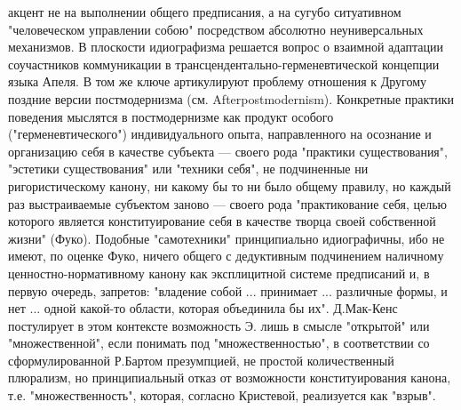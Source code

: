 \documentclass[12pt]{article}
\begin{document}
акцент не на выполнении общего предписания, а на сугубо ситуативном "человеческом управлении собою"
посредством абсолютно неуниверсальных механизмов. В плоскости идиографизма решается вопрос о взаимной
адаптации соучастников коммуникации в трансцендентально-герменевтической концепции языка Апеля. В том
же  ключе  артикулируют  проблему  отношения  к  Другому  поздние  версии  постмодернизма  (см.  Afterpostmodernism).  Конкретные  практики  поведения  мыслятся  в  постмодернизме  как  продукт  особого
("герменевтического") индивидуального опыта, направленного на осознание и организацию себя в качестве
субъекта  —  своего  рода  "практики  существования",  "эстетики  существования"  или  "техники  себя",  не
подчиненные  ни  ригористическому  канону,  ни  какому  бы  то  ни  было  общему  правилу,  но  каждый  раз
выстраиваемые  субъектом  заново  —  своего  рода  "практикование  себя,  целью  которого  является
конституирование  себя  в  качестве  творца  своей  собственной  жизни"  (Фуко).  Подобные  "самотехники"
принципиально идиографичны, ибо не имеют, по оценке Фуко, ничего общего с дедуктивным подчинением
наличному  ценностно-нормативному  канону  как  эксплицитной  системе  предписаний  и,  в  первую  очередь,
запретов:  "владение  собой  ...  принимает  ...  различные  формы,  и  нет  ...  одной  какой-то  области,  которая
объединила бы их". Д.Мак-Кенс постулирует в этом контексте возможность Э. лишь в смысле "открытой" или
"множественной",  если  понимать  под  "множественностью",  в  соответствии  со  сформулированной  Р.Бартом
презумпцией,  не  простой  количественный  плюрализм,  но  принципиальный  отказ  от  возможности
конституирования канона, т.е. "множественность", которая, согласно Кристевой, реализуется как "взрыв".

\newpage
\end{document}
